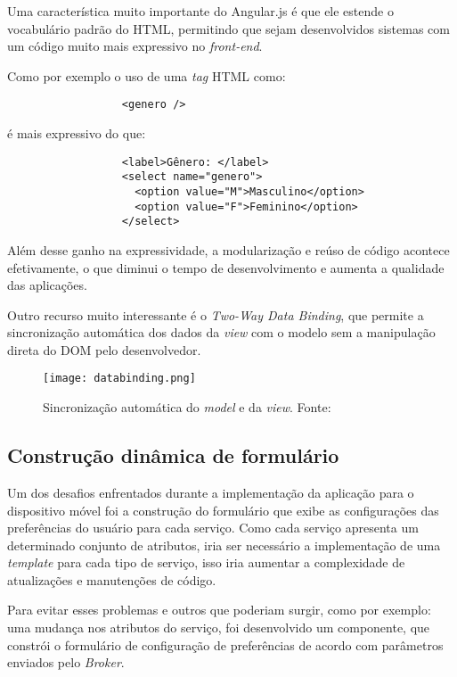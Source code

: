 Uma característica muito importante do Angular.js é que ele estende o vocabulário padrão do HTML, permitindo que sejam desenvolvidos sistemas com um código muito mais expressivo no \textit{front-end}.

Como por exemplo o uso de uma \textit{tag} HTML como: 
\begin{verbatim}
                  <genero />
\end{verbatim}

é mais expressivo do que:

\begin{verbatim}
                  <label>Gênero: </label>
                  <select name="genero">
                    <option value="M">Masculino</option>
                    <option value="F">Feminino</option>
                  </select>
\end{verbatim}

Além desse ganho na expressividade, a modularização e reúso de código acontece efetivamente, o que diminui o tempo de desenvolvimento e aumenta a qualidade das aplicações.

Outro recurso muito interessante é o \textit{Two-Way Data Binding}, que permite a sincronização automática dos dados da \textit{view} com o modelo sem a manipulação direta do DOM pelo desenvolvedor.

\begin{figure}[!htb]
  \centering
  \texttt{[image: databinding.png]} %
  \caption[Sincronização automática do \textit{model} e da \textit{view}]{Sincronização automática do \textit{model} e da \textit{view}. Fonte: \cite{angulardb}}
  \label{fig:twoway}
\end{figure}

\subsection{Construção dinâmica de formulário}
Um dos desafios enfrentados durante a implementação da aplicação para o dispositivo móvel foi a construção do formulário que exibe as configurações das preferências do usuário para cada serviço. Como cada serviço apresenta um determinado conjunto de atributos, iria ser necessário a implementação de uma \textit{template} para cada tipo de serviço, isso iria aumentar a complexidade de atualizações e manutenções de código.

Para evitar esses problemas e outros que poderiam surgir, como por exemplo: uma mudança nos atributos do serviço, foi desenvolvido um componente, que constrói o formulário de configuração de preferências de acordo com parâmetros enviados pelo \textit{Broker}.

